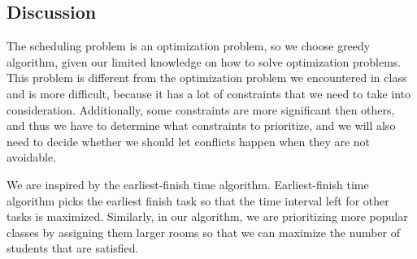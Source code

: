 \documentclass[11pt, oneside]{article}   	%
\begin{document}


\subsection{Discussion}
The scheduling problem is an optimization problem, so we choose greedy algorithm, given our limited knowledge on how to solve optimization problems. This problem is different from the optimization problem we encountered in class and is more difficult, because it has a lot of constraints that we need to take into consideration. Additionally, some constraints are more significant then others, and thus we have to determine what constraints to prioritize, and we will also need to decide whether we should let conflicts happen when they are not avoidable.

We are inspired by the earliest-finish time algorithm. Earliest-finish time algorithm picks the earliest finish task so that the time interval left for other tasks is maximized. Similarly, in our algorithm, we are prioritizing more popular classes by assigning them larger rooms so that we can maximize the number of students that are satisfied.



\end{document}
